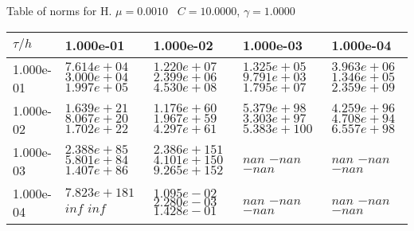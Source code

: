 \begin{center}
Table of norms for H. $\mu = 0.0010$ \, $C = 10.0000$, $\gamma = 1.0000$
  
\begin{tabular}{|p{1in}|p{1in}|p{1in}|p{1in}|p{1in}|} \hline
$\tau / h$ &1.000e-01 &1.000e-02 &1.000e-03 &1.000e-04 \\ \hline 
1.000e-01 & $7.614e+04$  $3.000e+04$  $1.997e+05$  & $1.220e+07$  $2.399e+06$  $4.530e+08$  & $1.325e+05$  $9.791e+03$  $1.795e+07$  & $3.963e+06$  $1.346e+05$  $2.359e+09$  \\ \hline 
1.000e-02 & $1.639e+21$  $8.067e+20$  $1.702e+22$  & $1.176e+60$  $1.967e+59$  $4.297e+61$  & $5.379e+98$  $3.303e+97$  $5.383e+100$  & $4.259e+96$  $4.708e+94$  $6.557e+98$  \\ \hline 
1.000e-03 & $2.388e+85$  $5.801e+84$  $1.407e+86$  & $2.386e+151$  $4.101e+150$  $9.265e+152$  & $nan$  $-nan$  $-nan$  & $nan$  $-nan$  $-nan$  \\ \hline 
1.000e-04 & $7.823e+181$  $inf$  $inf$  & $1.095e-02$  $2.280e-03$  $1.428e-01$  & $nan$  $-nan$  $-nan$  & $nan$  $-nan$  $-nan$  \\ \hline 

\end{tabular}\\[20pt]
\end{center}
